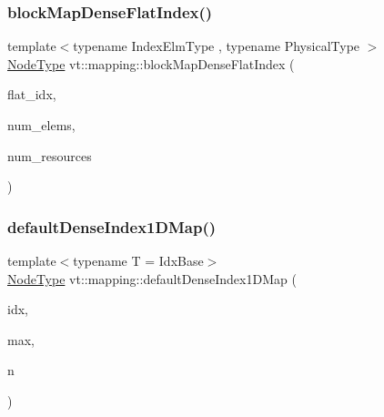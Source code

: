 \subsubsection{\texorpdfstring{block\+Map\+Dense\+Flat\+Index()}{blockMapDenseFlatIndex()}}
{\footnotesize\ttfamily template$<$typename Index\+Elm\+Type , typename Physical\+Type $>$ \\
\hyperlink{namespacevt_a866da9d0efc19c0a1ce79e9e492f47e2}{Node\+Type} vt\+::mapping\+::block\+Map\+Dense\+Flat\+Index (\begin{DoxyParamCaption}\item[{Index\+Elm\+Type $\ast$}]{flat\+\_\+idx,  }\item[{Index\+Elm\+Type $\ast$}]{num\+\_\+elems,  }\item[{Physical\+Type}]{num\+\_\+resources }\end{DoxyParamCaption})\hspace{0.3cm}{\ttfamily [inline]}}

\mbox{\label{namespacevt_1_1mapping_ae055a42b89a59fd6d0cc6d40f9abf3b5}} 
\subsubsection{\texorpdfstring{default\+Dense\+Index1\+D\+Map()}{defaultDenseIndex1DMap()}}
{\footnotesize\ttfamily template$<$typename T  = Idx\+Base$>$ \\
\hyperlink{namespacevt_a866da9d0efc19c0a1ce79e9e492f47e2}{Node\+Type} vt\+::mapping\+::default\+Dense\+Index1\+D\+Map (\begin{DoxyParamCaption}\item[{\hyperlink{namespacevt_1_1mapping_a8b576cf2f31069778e4951f64bccafd8}{Idx1\+D\+Ptr}$<$ T $>$}]{idx,  }\item[{\hyperlink{namespacevt_1_1mapping_a8b576cf2f31069778e4951f64bccafd8}{Idx1\+D\+Ptr}$<$ T $>$}]{max,  }\item[{\hyperlink{namespacevt_a866da9d0efc19c0a1ce79e9e492f47e2}{Node\+Type}}]{n }\end{DoxyParamCaption})}

\mbox{\label{namespacevt_1_1mapping_a011c4e2cb832d3edcd98e3803d405ad4}} 
